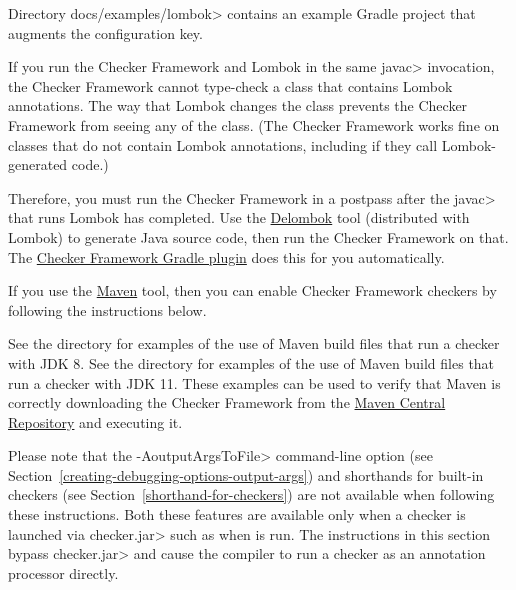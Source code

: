 Directory \<docs/examples/lombok> contains an example Gradle project that
augments the configuration key.





If you run the Checker Framework and Lombok in the same \<javac>
invocation, the Checker Framework cannot type-check a class that contains
Lombok annotations.  The way that Lombok changes the class prevents the
Checker Framework from seeing any of the class.  (The Checker Framework
works fine on classes that do not contain Lombok annotations, including if
they call Lombok-generated code.)

Therefore, you must run the Checker Framework in a postpass after the
\<javac> that runs Lombok has completed.  Use the
\href{https://projectlombok.org/features/delombok}{Delombok} tool
(distributed with Lombok) to generate Java source code, then run the
Checker Framework on that.  The
\href{https://github.com/kelloggm/checkerframework-gradle-plugin}{Checker
  Framework Gradle plugin} does this for you automatically.



If you use the \href{http://maven.apache.org/}{Maven} tool,
then you can enable Checker Framework checkers by following the
instructions below.

See the directory  for examples of the use of
Maven build files that run a checker with JDK 8.
See the directory  for examples of the use of
Maven build files that run a checker with JDK 11.
These examples can be used to verify that
Maven is correctly downloading the Checker Framework from the
\href{https://search.maven.org/search?q=org.checkerframework}{Maven
  Central Repository} and executing it.

Please note that the \<-AoutputArgsToFile> command-line option
(see Section~\ref{creating-debugging-options-output-args}) and shorthands for built-in checkers
(see Section~\ref{shorthand-for-checkers}) are not available when
following these instructions.  Both these features are available only when a checker is
launched via \<checker.jar> such as when 
is run.  The instructions in this section
bypass \<checker.jar> and cause the compiler to run a
checker as an annotation processor directly.

